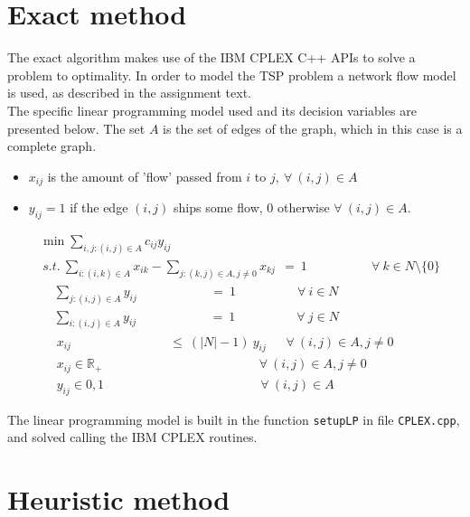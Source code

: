 \section{Exact method}
\label{chap:cplexm}
The exact algorithm makes use of the IBM CPLEX C++ APIs to solve a problem to optimality. In order to model the TSP problem a network flow model is used, as described in the assignment text. \\
The specific linear programming model used and its decision variables are presented below. The set $A$ is the set of edges of the graph, which in this case is a complete graph.
\begin{itemize}
	\item $x_{ij}$ is the amount of 'flow' passed from $i$ to $j,~\forall~(i,j)\in A$
	\item $y_{ij} = 1$ if the edge $(i,j)$ ships some flow, $0$ otherwise $\forall~(i,j)\in A$.
\end{itemize}
\begin{align}
	&\min \sum\limits_{i,j:(i,j)\in A} c_{ij}y_{ij}\\
	&~s.t.~\sum_{i:(i,k)\in A}x_{ik} - \sum_{j:(k,j)\in A, j\ne 0}x_{kj}~~=~1~~~~~~~~~~~~~~~~~~~~~~~\forall~k \in N \setminus \{0\}\\
	& ~~~~~\sum_{j:(i,j)\in A} y_{ij}~~~~~~~~~~~~~~~~~~~~~~~~~~=~1~~~~~~~~~~~~~~~~~~~~~~\forall~i \in N\\
	& ~~~~~\sum_{i:(i,j)\in A} y_{ij}~~~~~~~~~~~~~~~~~~~~~~~~~~=~1~~~~~~~~~~~~~~~~~~~~~~\forall~j \in N\\ 
	&~~~~~~x_{ij}~~~~~~~~~~~~~~~~~~~~~~~~~~~~~~~~~~~\le~(|N|-1)~y_{ij}~~~~~~~\forall~(i,j) \in A,j\ne 0\\
	&~~~~~~x_{ij} \in \mathbb{R}_+~~~~~~~~~~~~~~~~~~~~~~~~~~~~~~~~~~~~~~~~~~~~~~~~~~~~~~~~\forall~(i,j) \in A,j\ne 0\\
	&~~~~~~y_{ij} \in {0,1}~~~~~~~~~~~~~~~~~~~~~~~~~~~~~~~~~~~~~~~~~~~~~~~~~~~~~~~~\forall~(i,j) \in A
\end{align}

The linear programming model is built in the function \texttt{setupLP} in file \texttt{CPLEX.cpp}, and solved calling the IBM CPLEX routines.

\section{Heuristic method}
\label{chap:heuris}

